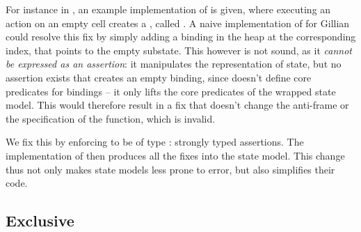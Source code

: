 For instance in \cite{sacha-phd}, an example implementation of \PMap{} is given, where executing an action on an empty cell creates a \Miss{}, called . A naive implementation of \PMap{} for Gillian could resolve this fix by simply adding a binding in the heap at the corresponding index, that points to the empty substate. This however is not sound, as it \emph{cannot be expressed as an assertion}: it manipulates the representation of state, but no assertion exists that creates an empty binding, since \PMap{} doesn't define core predicates for bindings -- it only lifts the core predicates of the wrapped state model. This would therefore result in a fix that doesn't change the anti-frame or the specification of the function, which is invalid.

We fix this by enforcing  to be of type : strongly typed assertions. The implementation of  then produces all the fixes into the state model. This change thus not only makes state models less prone to error, but also simplifies their code.

\subsection{Exclusive} \label{subsec:ex-impl}

